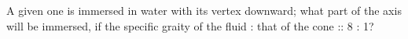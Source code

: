 A given one is immersed in water with its vertex downward; 
what part of the axis will be immersed, if the specific 
graity of the fluid : that of the cone :: 8 : 1?
